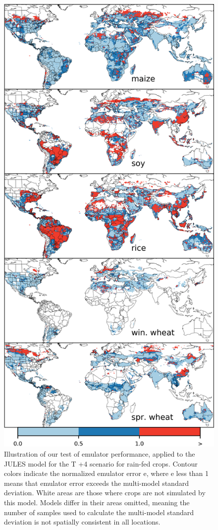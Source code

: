 \documentclass[10pt]{article}
\begin{document}
\begin{figure}[h!]
\begin{minipage}{.45\textwidth}
\caption{Illustration  of  our  test  of  emulator  performance,  applied  to  the JULES model for the T +4 scenario for rain-fed crops.  Contour colors indicate the normalized emulator error e, where e less than 1 means that emulator error exceeds the multi-model standard deviation. White areas are those where crops are not simulated by this model. Models differ in their areas omitted, meaning the number of samples used to calculate the multi-model standard deviation is not spatially consistent in all locations.}
\label{fig:errorjules}
\end{minipage}
\hspace{.05\linewidth}
\begin{minipage}{.45\textwidth}
\centering
\includegraphics[width=\textwidth]{s_em_err_PROMET.png}

\end{minipage}
\end{figure}
\end{document}

